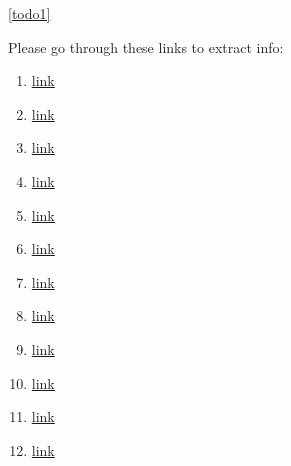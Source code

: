 \documentclass[10pt, openany]{book}
\begin{document}
\tableofcontents
\begin{todo}
    \item \ref{todo1}
\end{todo}

\newpage


\newpage


\newpage


\newpage


Please go through these links to extract info:
\begin{enumerate}
    \item \href{https://www.youtube.com/watch?v=WujIkCgawFI&list=PLmK1EnKxphinxBub5hL0ZoJXWoqjkGE19&index=11}{link}
    \item \href{https://www.youtube.com/watch?v=jgh0TNfx0gQ}{link}
    \item \href{https://eshop.se.com/in/blog/post/difference-between-active-power-reactive-power-and-apparent-power.html#}{link}
    \item \href{https://www.allaboutcircuits.com/textbook/alternating-current/chpt-11/true-reactive-and-apparent-power/}{link}
    \item \href{https://laurenselectric.com/commercial-services/understanding-power-factor/}{link}
    \item \href{https://www.eeeguide.com/substations-interview-questions-and-answers/}{link}
    \item \href{https://circuitglobe.com/types-of-faults-in-power-system.html}{link}
    \item \href{https://peguru.com/2019/08/voltage-transformer/}{link}
    \item \href{https://www.pes-psrc.org/kb/report/047.pdf}{link}
    \item \href{https://electrical-engineering-portal.com/download-center/books-and-guides/relays}{link}
    \item \href{https://www.studyforfe.com/blog/fundamentals-of-single-line-diagrams/}{link}
    \item \href{https://eepower.com/technical-articles/calculating-the-turns-ratio-of-a-transformer/}{link}

\end{enumerate}
\end{document}
